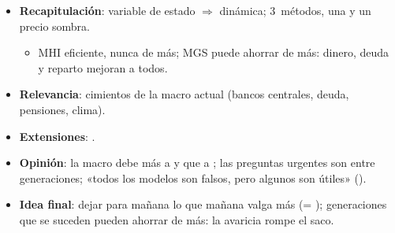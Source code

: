 \documentclass{article}
\begin{document}
\begin{columnas}
\begin{itemize}
\item \textbf{Recapitulación}: variable de estado $\Rightarrow$ dinámica; 3~métodos, una  y un precio sombra.
  \begin{itemize}
  \item MHI eficiente, nunca de más; MGS puede ahorrar de más: dinero, deuda y reparto mejoran a todos.
  \end{itemize}
\item \textbf{Relevancia}: cimientos de la macro actual (bancos centrales, deuda, pensiones, clima).
\item \textbf{Extensiones}:      .
\item \textbf{Opinión}: la macro debe más a  y  que a ; las preguntas urgentes son entre generaciones; «todos los modelos son falsos, pero algunos son útiles» ().
\item \textbf{Idea final}: dejar para mañana lo que mañana valga más (= ); generaciones que se suceden pueden ahorrar de más: la avaricia rompe el saco.
\end{itemize}


\end{columnas}
\end{document}
